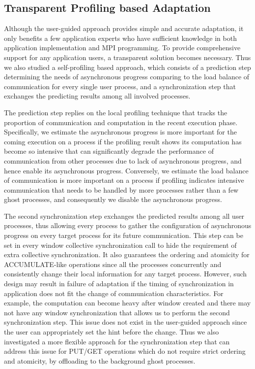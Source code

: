 \subsection{Transparent Profiling based Adaptation}\label{sec:des-adpt-prof}
Although the user-guided approach provides simple and accurate
adaptation, it only benefits a few application experts who have sufficient
knowledge in both application implementation and MPI programming.
To provide comprehensive support for any application users, a transparent
solution becomes necessary. Thus we also studied a self-profiling based
approach, which consists of a prediction step determining the needs of
asynchronous progress comparing to the load balance of communication for
every single user process, and a synchronization step that exchanges the
predicting results among all involved processes.

The prediction step replies on the local profiling technique that tracks the
proportion of communication and computation in the recent execution phase.
Specifically, we estimate the asynchronous progress is more important for
the coming execution on a process if the profiling result shows its
computation has become so intensive that can significantly degrade the
performance of communication from other processes due to lack of
asynchronous progress, and hence enable its asynchronous progress.
Conversely, we estimate the load balance of communication is
more important on a process if profiling indicates intensive communication
that needs to be handled by more processes rather than a few ghost
processes, and consequently we disable the asynchronous progress.

The second synchronization step exchanges the predicted results among
all user processes, thus allowing every process to gather the configuration
of asynchronous progress on every target process for its future communication.
This step can be set in every window collective synchronization call to
hide the requirement of extra collective synchronization. It also guarantees
the ordering and atomicity for ACCUMULATE-like operations since all the
processes concurrently and consistently change their local information
for any target process.
However, such design may result in failure of adaptation if the timing
of synchronization in application does not fit the change of communication
characteristics. For example, the computation can become heavy after
window created and there may not have any window synchronization that
allows us to perform the second synchronization step. This issue does
not exist in the user-guided approach since the user can appropriately
set the hint before the change. Thus we also investigated a more flexible
approach for the synchronization step that can address this issue for
PUT/GET operations which do not require strict ordering and atomicity,
by offloading to the background ghost processes.

